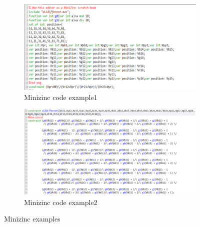 \begin{figure}[htbp]
\centering
\begin{subfigure}[b]{.48\textwidth}
\centering
\includegraphics[width=\textwidth]{figs/minizincexample1.png}
\caption{Minizinc code example1}
  \label{fig:minizincexample1}
\end{subfigure}
\begin{subfigure}[b]{.48\textwidth}
\centering
\includegraphics[width=\textwidth]{figs/minizincexample2.png}
\caption{Minizinc code example2}
  \label{fig:minizincexample2}
\end{subfigure}
\caption{Minizinc examples}
  \label{fig:minizincexamples}
\end{figure}

   

  


